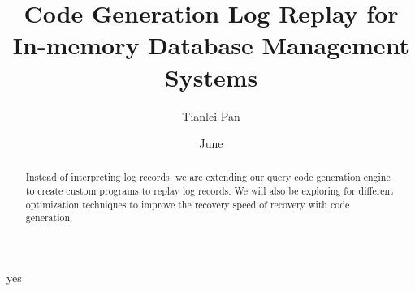 \documentclass[12pt]{cmuthesis}
\begin{document}
 
\frontmatter

\pagestyle{empty}

\title{ %
{\bf Code Generation Log Replay for In-memory Database Management Systems}}
\author{Tianlei Pan}
\date{June}
\trnumber{}


\support{}
\disclaimer{}



\maketitle

\begin{dedication}
\end{dedication}

\pagestyle{plain} %


\begin{abstract}
Instead of interpreting log records, we are extending our query code generation engine to create custom programs to replay log records. We will also be exploring for different optimization techniques to improve the recovery speed of recovery with code generation.
\end{abstract}

\begin{acknowledgments}
yes
\end{acknowledgments}



\tableofcontents
\listoffigures
\listoftables

\mainmatter


%
%
%
%
%
\end{document}

